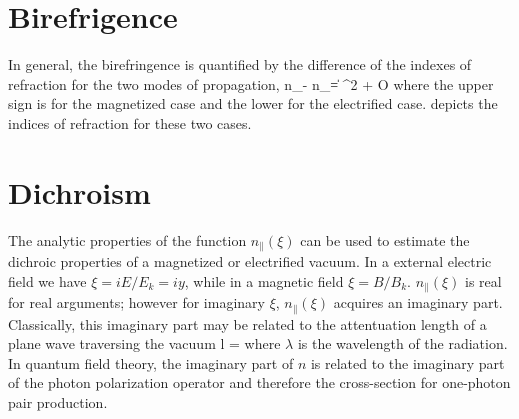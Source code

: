 \section{Birefrigence}

In general, the birefringence is quantified by the difference of the
indexes of refraction for the two modes of propagation,
\be
n_\perp - n_\| = \pm \frac{\alpha}{4\pi}  \sin^2\theta
+ {\cal O}\left[ \left (\frac{\alpha}{2\pi} \right )^2 \right]
\ee
where the upper sign is for the magnetized case and the lower for
the electrified case.   depicts the indices of
refraction for these two cases.  

\section{Dichroism}

The analytic properties of the function $n_\|(\xi)$ can be used to
estimate the dichroic properties of a magnetized or electrified
vacuum.  In a external electric field we have $\xi=i E/E_k=i y$, while in
a magnetic field $\xi=B/B_k$.  $n_\|(\xi)$ is real for real arguments;
however for imaginary $\xi$, $n_\|(\xi)$ acquires an imaginary
part.  Classically, this imaginary part may be related to the
attentuation length of a plane wave traversing the vacuum
\be
l = 
\ee
where $\lambda$ is the wavelength of the radiation.  In quantum field
theory, the imaginary part of $n$ is related to the imaginary
part of the photon polarization operator and therefore the
cross-section for one-photon pair production.

